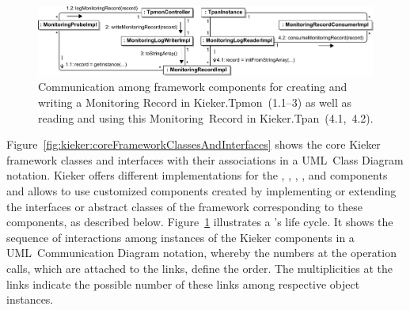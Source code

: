 \begin{figure}\centering
\includegraphics[width=1\textwidth]{figures/kiekerCommunications-revisedReArranged-woMonitoringLog-bw}%
\caption{Communication among framework components %
for creating and writing a Monitoring Record in Kieker.Tpmon~(1.1--3) as well as %
reading and using this Monitoring~Record in Kieker.Tpan~(4.1,~4.2). %
}
\label{fig:kieker:communicationsAmongCoreFrameworkComponents}
\end{figure}

Figure~\ref{fig:kieker:coreFrameworkClassesAndInterfaces} shows the core
Kieker framework classes and interfaces with their associations in a UML~Class %
Diagram notation. %
Kieker offers different implementations for the \MonitoringRecord{}, %
\MonitoringProbe{}, \MonitoringLogWriter{}, %
\MonitoringLogReader{}, and \MonitoringRecordConsumer{} %
components and allows to use customized components created by implementing or %
extending the interfaces or abstract classes of the framework corresponding to these components, as described below.
% 
% 
Figure~\ref{fig:kieker:communicationsAmongCoreFrameworkComponents} illustrates a \MonitoringRecord{}'s life cycle. It shows the
sequence of interactions among instances of the
Kieker components in a UML~Communication Diagram
notation, whereby the numbers at the operation calls, which are attached to the links, define the order. The multiplicities at the links indicate the possible number of these links among respective object instances.





